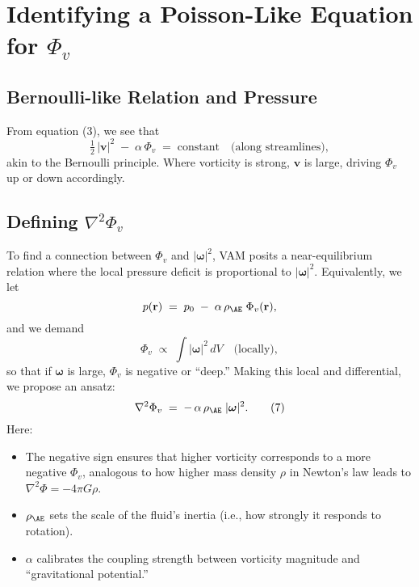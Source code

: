 \section{Identifying a Poisson-Like Equation for \(\Phi_v\)}

\subsection{Bernoulli-like Relation and Pressure}
From equation (3), we see that
\[
    \tfrac12\,|\mathbf{v}|^2
    \;-\;
    \alpha\,\Phi_v
    \;=\;
    \mathrm{constant}
    \quad
    \text{(along streamlines)},
\]
akin to the Bernoulli principle. Where vorticity is strong, \(\mathbf{v}\) is large, driving \(\Phi_v\) up or down accordingly.

\subsection{Defining \(\nabla^2 \Phi_v\)}
To find a connection between \(\Phi_v\) and \(|\boldsymbol{\omega}|^2\), VAM posits a near-equilibrium relation where the local pressure deficit is proportional to \(|\boldsymbol{\omega}|^2\). Equivalently, we let
\[
    p(\mathbf{r})
    \;=\;
    p_0
    \;-\;
    \alpha\,\rho_{\mathrm{\AE}}
    \;\Phi_v(\mathbf{r}),
\]
and we demand
\[
    \Phi_v
    \;\propto\;
    \int |\boldsymbol{\omega}|^2 \,dV
    \quad
    \text{(locally)},
\]
so that if \(\boldsymbol{\omega}\) is large, \(\Phi_v\) is negative or “deep.”  Making this local and differential, we propose an ansatz:
\[
    \nabla^2 \Phi_v
    \;=\;
    -\,\alpha\,\rho_{\mathrm{\AE}}\;\lvert \boldsymbol{\omega}\rvert^2.
    \tag{7}
\]
Here:
\begin{itemize}
    \item The negative sign ensures that higher vorticity corresponds to a more negative \(\Phi_v\), analogous to how higher mass density \(\rho\) in Newton’s law leads to \(\nabla^2 \Phi = -4\pi G\rho\).
    \item \(\rho_{\mathrm{\AE}}\) sets the scale of the fluid’s inertia (i.e., how strongly it responds to rotation).
    \item \(\alpha\) calibrates the coupling strength between vorticity magnitude and “gravitational potential.”
\end{itemize}

